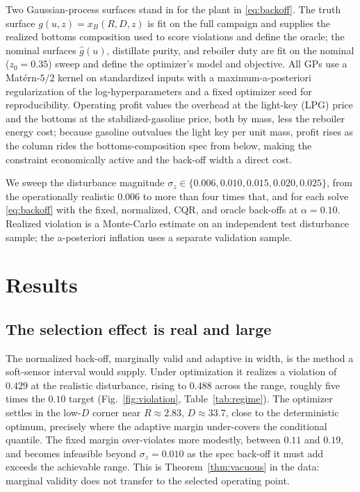 \documentclass[journal]{IEEEtran}
\begin{document}
Two Gaussian-process surfaces stand in for the plant in \eqref{eq:backoff}. The truth surface
$g(u,z)=x_B(R,D,z)$ is fit on the full campaign and supplies the realized bottoms composition used
to score violations and define the oracle; the nominal surfaces $\hat g(u)$, distillate purity,
and reboiler duty are fit on the nominal ($z_0=0.35$) sweep and define the optimizer's model and
objective. All GPs use a Mat\'ern-$5/2$ kernel on standardized inputs with a
maximum-a-posteriori regularization of the log-hyperparameters and a fixed optimizer seed for
reproducibility. Operating profit values the overhead at the light-key (LPG) price and the bottoms
at the stabilized-gasoline price, both by mass, less the reboiler energy cost; because gasoline
outvalues the light key per unit mass, profit rises as the column rides the bottoms-composition
spec from below, making the constraint economically active and the back-off width a direct cost.

We sweep the disturbance magnitude $\sigma_z\in\{0.006,0.010,0.015,0.020,0.025\}$, from the
operationally realistic $0.006$ to more than four times that, and for each solve \eqref{eq:backoff}
with the fixed, normalized, CQR, and oracle back-offs at $\alpha=0.10$. Realized violation is a
Monte-Carlo estimate on an independent test disturbance sample; the a-posteriori inflation uses a
separate validation sample.

\section{Results}
\label{sec:results}

\subsection{The selection effect is real and large}
The normalized back-off, marginally valid and adaptive in width, is the method a soft-sensor
interval would supply. Under optimization it realizes a violation of $0.429$ at the realistic
disturbance, rising to $0.488$ across the range, roughly five times the $0.10$ target
(Fig.~\ref{fig:violation}, Table~\ref{tab:regime}). The optimizer settles in the low-$D$ corner
near $R\approx2.83$, $D\approx33.7$, close to the deterministic optimum, precisely where the
adaptive margin under-covers the conditional quantile. The fixed margin over-violates more
modestly, between $0.11$ and $0.19$, and becomes infeasible beyond $\sigma_z=0.010$ as the spec
back-off it must add exceeds the achievable range. This is Theorem~\ref{thm:vacuous} in the data: marginal validity does not
transfer to the selected operating point.
\end{document}
